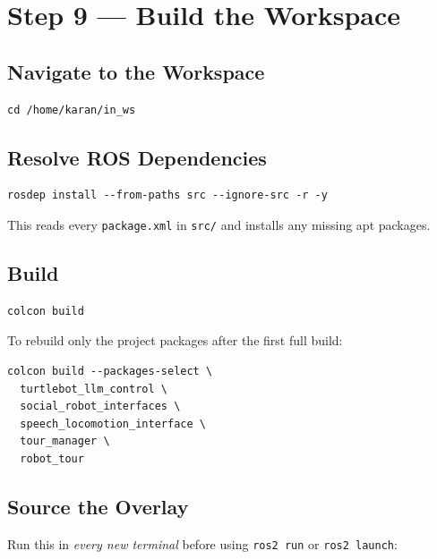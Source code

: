 \documentclass[12pt,a4paper]{report}
\newcommand{\file}[1]{\texttt{\color{black!70}#1}}
\begin{document}
\section{Step 9 --- Build the Workspace}

\subsection{Navigate to the Workspace}

\begin{lstlisting}[style=bashstyle]
cd /home/karan/in_ws
\end{lstlisting}

\subsection{Resolve ROS Dependencies}

\begin{lstlisting}[style=bashstyle, caption={Install all ROS package dependencies}]
rosdep install --from-paths src --ignore-src -r -y
\end{lstlisting}

This reads every \file{package.xml} in \file{src/} and installs any
missing apt packages.

\subsection{Build}

\begin{lstlisting}[style=bashstyle, caption={Full workspace build}]
colcon build
\end{lstlisting}

To rebuild only the project packages after the first full build:

\begin{lstlisting}[style=bashstyle, caption={Incremental build (faster)}]
colcon build --packages-select \
  turtlebot_llm_control \
  social_robot_interfaces \
  speech_locomotion_interface \
  tour_manager \
  robot_tour
\end{lstlisting}

\subsection{Source the Overlay}

Run this in \emph{every new terminal} before using \texttt{ros2 run} or
\texttt{ros2 launch}:
\end{document}
